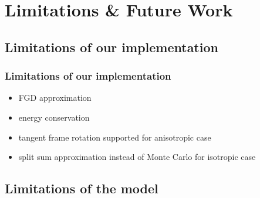 
\section{Limitations \& Future Work}

\subsection{Limitations of our implementation}

\begin{frame}
    \frametitle{Limitations of our implementation}
    \begin{itemize}
        \setlength\itemsep{1em}
        \item FGD approximation
        \item energy conservation
        \item tangent frame rotation supported for anisotropic case
        \item split sum approximation instead of Monte Carlo for isotropic case
    \end{itemize}
\end{frame}

\subsection{Limitations of the model}

